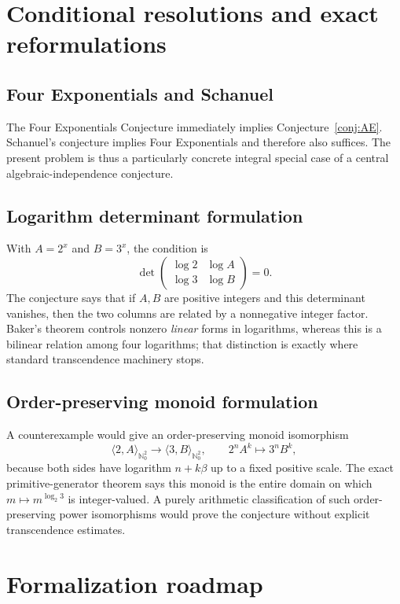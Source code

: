 \documentclass[11pt,oneside]{article}
\theoremstyle{definition}
\theoremstyle{remark}
\newcommand{\Nzero}{\mathbb N_0}
\begin{document}
\section{Conditional resolutions and exact reformulations}

\subsection{Four Exponentials and Schanuel}

The Four Exponentials Conjecture immediately implies
Conjecture~\ref{conj:AE}.  Schanuel's conjecture implies Four Exponentials and
therefore also suffices.  The present problem is thus a particularly concrete
integral special case of a central algebraic-independence conjecture.

\subsection{Logarithm determinant formulation}

With $A=2^x$ and $B=3^x$, the condition is
\[
 \det\begin{pmatrix}
 \log2&\log A\\
 \log3&\log B
 \end{pmatrix}=0.
\]
The conjecture says that if $A,B$ are positive integers and this determinant
vanishes, then the two columns are related by a nonnegative integer factor.
Baker's theorem controls nonzero \emph{linear} forms in logarithms, whereas
this is a bilinear relation among four logarithms; that distinction is exactly
where standard transcendence machinery stops.

\subsection{Order-preserving monoid formulation}

A counterexample would give an order-preserving monoid isomorphism
\[
 \langle2,A\rangle_{\Nzero^2}\longrightarrow
 \langle3,B\rangle_{\Nzero^2},
 \qquad2^nA^k\mapsto3^nB^k,
\]
because both sides have logarithm $n+k\beta$ up to a fixed positive scale.
The exact primitive-generator theorem says this monoid is the entire domain on which
$m\mapsto m^{\log_2 3}$ is integer-valued.  A purely arithmetic classification
of such order-preserving power isomorphisms would prove the conjecture without
explicit transcendence estimates.

\section{Formalization roadmap}
\end{document}
